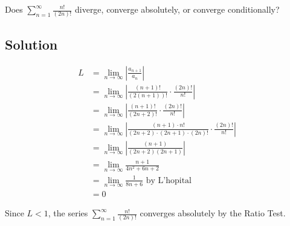 \documentclass{article}
\begin{document}
\noindent
Does $\displaystyle \sum_{n=1}^\infty \frac{n!}{(2n)!}$
diverge, converge absolutely, or converge conditionally?

\subsection*{Solution}

\begin{align*}
L
&=\lim_{n \to \infty} \left|\frac{a_{n+1}}{a_n}\right|\\
&=\lim_{n \to \infty} \left|\frac{(n+1)!}{(2(n+1))!} \cdot \frac{(2n)!}{n!}\right|\\
&=\lim_{n \to \infty} \left|\frac{(n+1)!}{(2n+2)!} \cdot \frac{(2n)!}{n!}\right|\\
&=\lim_{n \to \infty} \left|\frac{(n+1) \cdot n!}{(2n+2) \cdot (2n+1) \cdot (2n)!} \cdot \frac{(2n)!}{n!}\right|\\
&=\lim_{n \to \infty} \left|\frac{(n+1)}{(2n+2)(2n+1)}\right|\\
&=\lim_{n \to \infty} \frac{n+1}{4n^2+6n+2}\\
&=\lim_{n \to \infty} \frac{1}{8n+6} \text{ by L'hopital}\\
&= 0
\end{align*}

Since $L< 1$, the series $\displaystyle \sum_{n=1}^\infty \frac{n!}{(2n)!}$ converges absolutely by the Ratio Test.
\end{document}
